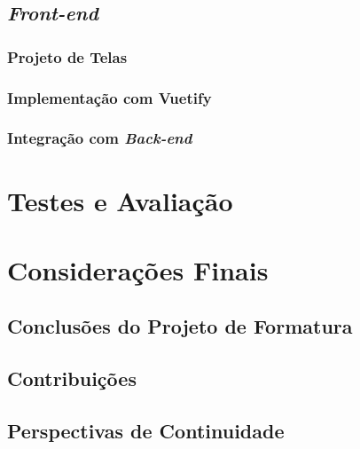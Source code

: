 \documentclass[]{politex}
\begin{document}
\section{\textit{Front-end}}


\subsection{Projeto de Telas}


\subsection{Implementação com Vuetify}


\subsection{Integração com \textit{Back-end}}


\chapter{Testes e Avaliação}


\chapter{Considerações Finais}


\section{Conclusões do Projeto de Formatura}


\section{Contribuições}


\section{Perspectivas de Continuidade}
\end{document}
